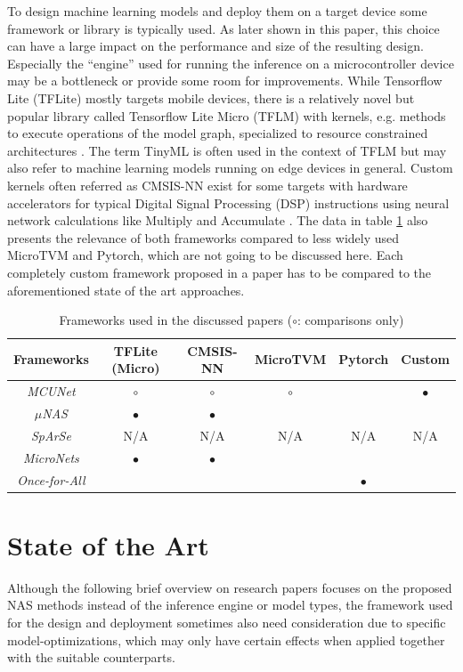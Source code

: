 \documentclass[10pt,        %
               a4paper,     %
               journal,     %
               ]{IEEEtran}
\begin{document}
To design machine learning models and deploy them on a target device some framework or library is typically used. As later shown in this paper, this choice can have a large impact on the performance and size of the resulting design. Especially the ``engine'' used for running the inference on a microcontroller device may be a bottleneck or provide some room for improvements. While Tensorflow Lite (TFLite) mostly targets mobile devices, there is a relatively novel but popular library called Tensorflow Lite Micro (TFLM) with kernels, e.g. methods to execute operations of the model graph, specialized to resource constrained architectures \cite{tflm2020}. The term TinyML is often used in the context of TFLM but may also refer to machine learning models running on edge devices in general. Custom kernels often referred as CMSIS-NN exist for some targets with hardware accelerators for typical Digital Signal Processing (DSP) instructions using neural network calculations like Multiply and Accumulate \cite{cmsisnn2018}. The data in table \ref{tbl:frameworks} also presents the relevance of both frameworks compared to less widely used MicroTVM and Pytorch, which are not going to be discussed here. Each completely custom framework proposed in a paper has to be compared to the aforementioned state of the art approaches.

\begin{table}[t!]
    \centering
    \footnotesize
        \caption{Frameworks used in the discussed papers ($\circ$: comparisons only)}
    \label{tbl:frameworks}
    \begin{tabular}{cccccc}
  \toprule
  \textbf{Frameworks} & TFLite (Micro) &  CMSIS-NN & MicroTVM & Pytorch & Custom  \\
  \midrule
  \textit{MCUNet}\cite{mcunet2020} & $\circ$ & $\circ$ & $\circ$ & & $\bullet$\\
  \textit{$\mu$NAS}\cite{unas2020} & $\bullet$ & $\bullet$ & & & \\
  \textit{SpArSe}\cite{sparse2019} & N/A & N/A & N/A & N/A & N/A\\
  \textit{MicroNets}\cite{micronets2020} & $\bullet$ & $\bullet$ & & & \\
  \textit{Once-for-All}\cite{once4all2019} & & & & $\bullet$ &\\
  \bottomrule
\end{tabular}
\end{table}


\section{State of the Art}\label{sec:sota}
Although the following brief overview on research papers focuses on the proposed NAS methods instead of the inference engine or model types, the framework used for the design and deployment sometimes also need consideration due to specific model-optimizations, which may only have certain effects when applied together with the suitable counterparts.
\end{document}
